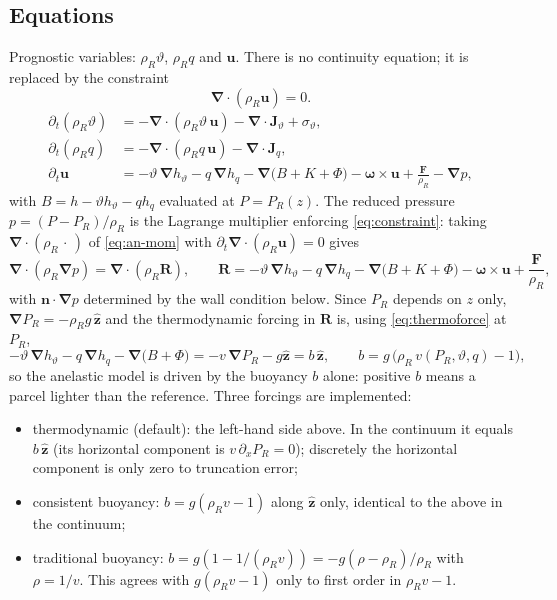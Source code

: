 \documentclass[11pt,a4paper]{article}
\newcommand{\vt}{\vartheta}                    %
\newcommand{\hth}{{h_{\vartheta}}}               %
\newcommand{\hq}{{h_q}}                          %
\newcommand{\bu}{\mathbf{u}}
\newcommand{\bn}{\mathbf{n}}
\newcommand{\ez}{\hat{\mathbf{z}}}
\newcommand{\bJ}{\mathbf{J}}
\newcommand{\bF}{\mathbf{F}}
\newcommand{\bnabla}{\boldsymbol{\nabla}}
\newcommand{\bomega}{\boldsymbol{\omega}}
\begin{document}
\subsection{Equations}
Prognostic variables: $\rho_R\vt$, $\rho_R q$ and $\bu$. There is no continuity equation; it is replaced by the constraint
\begin{equation}
  \bnabla\!\cdot(\rho_R\bu)=0 .
  \label{eq:constraint}
\end{equation}
\begin{subequations}\label{eq:an}
\begin{align}
  \partial_t(\rho_R\vt) &= -\bnabla\!\cdot(\rho_R\vt\,\bu) - \bnabla\!\cdot\bJ_\vt + \sigma_\vt,\\
  \partial_t(\rho_R q) &= -\bnabla\!\cdot(\rho_R q\,\bu) - \bnabla\!\cdot\bJ_q,\\
  \partial_t\bu &= -\vt\,\bnabla\hth - q\,\bnabla\hq - \bnabla\big(B+K+\Phi\big) - \bomega\times\bu + \frac{\bF}{\rho_R} - \bnabla p ,
  \label{eq:an-mom}
\end{align}
\end{subequations}
with $B=h-\vt\hth-q\hq$ evaluated at $P=P_R(z)$. The reduced pressure $p=(P-P_R)/\rho_R$ is the Lagrange multiplier enforcing \eqref{eq:constraint}:
taking $\bnabla\!\cdot(\rho_R\,\cdot\,)$ of \eqref{eq:an-mom} with $\partial_t\bnabla\!\cdot(\rho_R\bu)=0$ gives
\begin{equation}
  \bnabla\!\cdot(\rho_R\bnabla p) = \bnabla\!\cdot(\rho_R\mathbf R),\qquad
  \mathbf R = -\vt\,\bnabla\hth - q\,\bnabla\hq - \bnabla\big(B+K+\Phi\big) - \bomega\times\bu + \frac{\bF}{\rho_R},
  \label{eq:poisson}
\end{equation}
with $\bn\!\cdot\!\bnabla p$ determined by the wall condition below. Since $P_R$ depends on $z$ only, $\bnabla P_R=-\rho_Rg\,\ez$ and the thermodynamic
forcing in $\mathbf R$ is, using \eqref{eq:thermoforce} at $P_R$,
\begin{equation}
  -\vt\,\bnabla\hth-q\,\bnabla\hq-\bnabla\big(B+\Phi\big) = -v\,\bnabla P_R - g\ez = b\,\ez,\qquad b = g\,\big(\rho_R\,v(P_R,\vt,q)-1\big),
\end{equation}
so the anelastic model is driven by the buoyancy $b$ alone: positive $b$ means a parcel lighter than the reference.
Three forcings are implemented:
\begin{itemize}
  \item thermodynamic (default): the left-hand side above. In the continuum it equals $b\,\ez$ (its horizontal component is $v\,\partial_xP_R=0$);
        discretely the horizontal component is only zero to truncation error;
  \item consistent buoyancy: $b=g(\rho_Rv-1)$ along $\ez$ only, identical to the above in the continuum;
  \item traditional buoyancy: $b=g(1-1/(\rho_R v))=-g(\rho-\rho_R)/\rho_R$ with $\rho=1/v$. This agrees with $g(\rho_Rv-1)$ only to first order in $\rho_Rv-1$.
\end{itemize}
\end{document}
